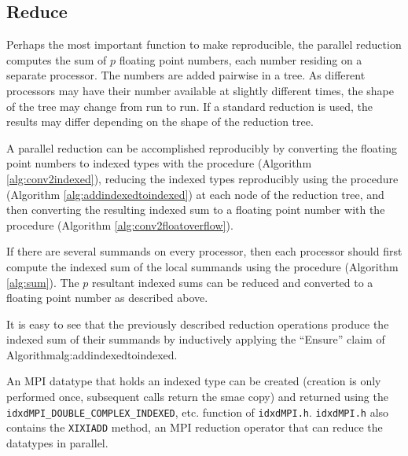 \subsection{Reduce}
  \label{sec:compositeops_reduce}
  Perhaps the most important function to make reproducible, the parallel reduction computes the sum of $p$ floating point numbers, each number residing on a separate processor. The numbers are added pairwise in a tree. As different processors may have their number available at slightly different times, the shape of the tree may change from run to run. If a standard reduction is used, the results may differ depending on the shape of the reduction tree.

  A parallel reduction can be accomplished reproducibly by converting the floating point numbers to indexed types with the  procedure (Algorithm \ref{alg:conv2indexed}), reducing the indexed types reproducibly using the  procedure (Algorithm \ref{alg:addindexedtoindexed}) at each node of the reduction tree, and then converting the resulting indexed sum to a floating point number with the  procedure (Algorithm \ref{alg:conv2floatoverflow}). 

  If there are several summands on every processor, then each processor should first compute the indexed sum of the local summands using the  procedure (Algorithm \ref{alg:sum}). The $p$ resultant indexed sums can be reduced and converted to a floating point number as described above.

  It is easy to see that the previously described reduction operations produce the indexed sum of their summands by inductively applying the ``Ensure'' claim of Algorithm{alg:addindexedtoindexed}.

  An MPI datatype that holds an indexed type can be created (creation is only performed once, subsequent calls return the smae copy) and returned using the \texttt{idxdMPI\_DOUBLE\_COMPLEX\_INDEXED}, etc. function of \texttt{idxdMPI.h}. \texttt{idxdMPI.h} also contains the \texttt{XIXIADD} method, an MPI reduction operator that can reduce the datatypes in parallel.
